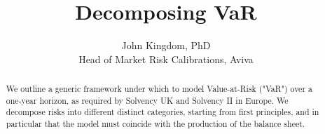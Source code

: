 \documentclass[10pt]{article}
\title{Decomposing VaR}
\author{John Kingdom, PhD\\Head of Market Risk Calibrations, Aviva}
\begin{document}
\maketitle

\begin{abstract}
We outline a generic framework under which to model Value-at-Risk ("VaR") over a one-year horizon, as required by Solvency UK and Solvency II in Europe. We decompose risks into different distinct categories, starting from first principles, and in particular that the model must coincide with the production of the balance sheet.
\end{abstract}





\end{document}
